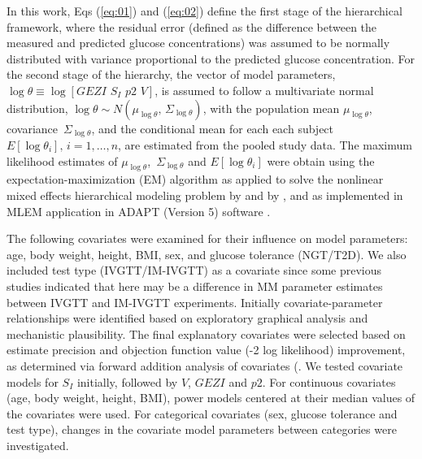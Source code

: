 \documentclass[utf8]{frontiersSCNS} %
\begin{document}
In this work, Eqs (\ref{eq:01}) and (\ref{eq:02}) define the first stage of the hierarchical framework, where the residual error (defined as the difference between the measured and predicted glucose concentrations) was assumed to be normally distributed with variance proportional to the predicted glucose concentration. For the second stage of the hierarchy, the vector of model parameters, $\log \theta  \equiv \log \left[ {GEZI\,\,{S_I}\,\,p2\,\,V} \right]$, is assumed to follow a multivariate normal distribution, $\log \theta  \sim N\left( {{\mu_{\log \theta }},\,{\Sigma _{\log \theta }}} \right)$, with the population mean   ${\mu _{\log \theta }}$, covariance $\,{\Sigma _{\log \theta }}$, and the conditional mean for each each subject $E\left[ {\log {\theta _i}} \right],\,i = 1, \ldots ,n$, are estimated from the pooled study data. The maximum likelihood estimates of   ${\mu _{\log \theta }}$, $\,{\Sigma _{\log \theta }}$ and $E\left[ {\log {\theta _i}} \right]$ were obtain using the expectation-maximization (EM) algorithm as applied to solve the nonlinear mixed effects hierarchical modeling problem by \citet{Schumitzky1995EMAnalysis} and  by \citet{walker_1996}, and as implemented in  MLEM application in ADAPT (Version 5) software \citep{AdaptUserGuide}. 

The following covariates were examined for their influence on  model parameters: age, body weight, height, BMI, sex, and glucose tolerance (NGT/T2D). We also included  test type (IVGTT/IM-IVGTT) as a covariate since some previous studies indicated that here may be a difference in MM parameter estimates between IVGTT and IM-IVGTT experiments. Initially covariate-parameter relationships were identified based on exploratory graphical analysis and mechanistic plausibility. The final explanatory covariates were selected based on estimate precision and  objection function value (-2 log likelihood) improvement, as determined via forward addition analysis of covariates (\citet{Bonate2011}. We tested covariate models for $S_I$ initially, followed by $V$, $GEZI$ and $p2$. For continuous covariates (age, body weight, height, BMI), power models centered at their median values of the covariates were used. For categorical covariates (sex, glucose tolerance and test type), changes in the covariate model parameters between categories were investigated. 

\vskip 0.5cm
\end{document}
